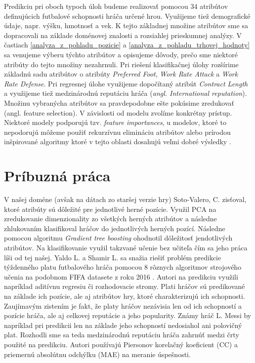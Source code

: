 \documentclass[runningheads]{llncs}
\begin{document}
Predikciu pri oboch typoch úloh budeme realizovať pomocou 34 atribútov definujúcich futbalové schopnosti hráča určené hrou. Využijeme tiež demografické údaje, napr. výšku, hmotnosť a vek. K tejto základnej množine atribútov sme sa dopracovali na základe doménovej znalosti a rozsiahlej prieskumnej analýzy. V častiach \ref{analyza_z_pohladu_pozicie} a \ref{analyza_z_pohladu_trhovej_hodnoty} sa venujeme výberu týchto atribútov a opisujeme dôvody, prečo sme niektoré atribúty do tejto množiny nezahrnuli.
Pri riešení klasifikačnej úlohy rozšírime základnú sadu atribútov o atribúty \textit{Preferred Foot}, \textit{Work Rate Attack} a \textit{Work Rate Defense}. Pri regresnej úlohe využijeme dopočítaný atribút \textit{Contract Length} a využijeme tiež medzinárodnú reputáciu hráča (\textit{angl. International reputation}).
Množinu vybranýcha atribútov sa pravdepodobne ešte pokúsime zredukovať (angl. feature selection). V závislosti od modelu zvolíme konkrétny prístup. Niektoré modely podporujú tzv. \textit{feature importances}, u modelov, ktoré to nepodorujú môžeme použiť rekurzívnu elimináciu atribútov alebo prírodou inšpirované algoritmy ktoré v tejto oblasti dosahujú veľmi dobré výsledky \cite{zawbaa2018large}.

\section{Príbuzná práca}

V našej doméne (avšak na dátach zo staršej verzie hry) Soto-Valero, C. \cite{RICYDE1165} zisťoval, ktoré atribúty sú dôležité pre jednotlivé herné pozície. Využil PCA na zredukovanie dimenzionality zo všetkých herných atribútov a následne zhlukovaním klasifikoval hráčov do jednotlivých herných pozící. Následne pomocou algoritmu \textit{Gradient tree boosting} ohodnotil dôležitosť jendotlivých atribútov. Na klasifikovanie využil takzvané učenie bez učiteľa čím sa jeho práca líši od tej našej.
Yaldo L. a Shamir L. sa snažia riešiť problém predikcie týždenného platu futbalového hráča pomocou 8 rôznych algoritmov strojového učenia na podobnom FIFA datasete z roku 2016 \cite{yaldo2017}. Autori na predikciu využili napríklad aditívnu regresiu či rozhodovacie stromy. Plati hráčov sú predikované na základe ich pozície, ale aj atribútov hry, ktoré charakterizujú ich schopnosti.
Zaujímavým zistením je fakt, že platy hráčov nezávisia len od ich schopností a pozície hráča, ale aj celkovej reputácie a jeho popularity. Známy hráč L. Messi by napríklad pri predikcii len na základe jeho schopností nedosiahol ani polovičný plat. Rozhodli sme sa teda medzinárodnú reputáciu hráča zahrnúť medzi črty použité na predikciu.
Autori používajú Piersonov korelačný koeficient (CC) a priemernú absolútnu odchýlku (MAE) na meranie úspešnosti.
\end{document}
